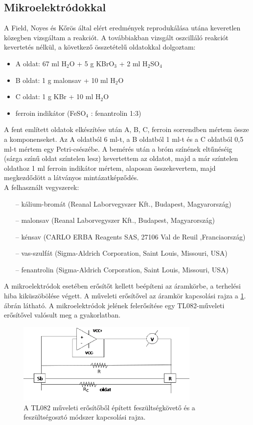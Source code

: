 \subsection{Mikroelektródokkal} \label{mikroelektrod}

A Field, Noyes és Kőrös által elért eredmények reprodukálása utána \cite{noyes1972oscillations} keveretlen közegben vizsgáltam a reakciót.
A továbbiakban vizsgált oszcilláló reakciót kevertetés nélkül, a következő összetételű oldatokkal dolgoztam: 

\begin{itemize} \label{komponensek}
\item A oldat: 67 ml H$_2$O + 5 g KBrO$_3$ + 2 ml H$_2$SO$_4$
\item B oldat: 1 g malonsav + 10 ml H$_2$O
\item C oldat: 1 g KBr + 10 ml H$_2$O
\item ferroin indikátor (FeSO$_4$ : fenantrolin 1:3)
\end{itemize}
A fent említett oldatok elkészítése után A, B, C, ferroin sorrendben mértem össze a komponenseket. Az A oldatból 6 ml-t, a B oldatból 1 ml-t és a C oldatból 0,5 ml-t mértem egy Petri-csészébe. A bemérés után a bróm színének eltűnéséig (sárga színű oldat színtelen lesz) kevertettem az oldatot, majd a már színtelen oldathoz 1 ml ferroin indikátor mértem, alaposan összekevertem, majd megkezdődött a látványos mintázatképződés.\\ 
A felhasznált vegyszerek:
\begin{itemize}
\item[--]kálium-bromát (Reanal Laborvegyszer Kft., Budapest, Magyarország)
\item[--]malonsav (Reanal Laborvegyszer Kft., Budapest, Magyarország)
\item[--]kénsav (CARLO ERBA Reagents SAS, 27106 Val de Reuil ,Franciaország)
\item[--]vas-szulfát (Sigma-Aldrich Corporation, Saint Louis, Missouri, USA)
\item[--]fenantrolin (Sigma-Aldrich Corporation, Saint Louis, Missouri, USA)
\end{itemize}
A mikroelektródok esetében erősítőt kellett beépíteni az áramkörbe, a terhelési hiba kiküszöbölése végett. A műveleti erősítővel az áramkör kapcsolási rajza a \ref{fig:erosito}. ábrán látható. A mikroelektródok jelének felerősítése egy TL082-műveleti erősítővel valósult meg a gyakorlatban.
\begin{figure}
\centering
\includegraphics[width=0.8\textwidth]{img/erosito2.png}
\caption{A TL082 műveleti erősítőből épített feszültségkövető és a feszültségosztó módszer kapcsolási rajza.}
\label{fig:erosito}
\end{figure}
